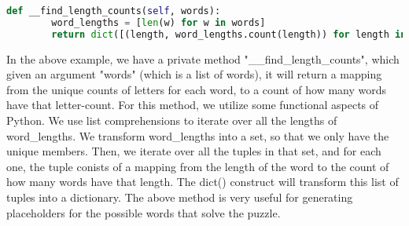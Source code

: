 \documentclass[11pt]{article}
\begin{document}
\begin{minipage}[t]{1\linewidth}
\begin{lstlisting}[language=Python, %
  title={Bash}, label=bash1]
    def __find_length_counts(self, words):
        word_lengths = [len(w) for w in words]
        return dict([(length, word_lengths.count(length)) for length in set(word_lengths)])
\end{lstlisting}
\end{minipage}

In the above example, we have a private method "\_\_find\_length\_counts", which given an argument "words" (which is a list of words), it will return a mapping from the unique counts of letters for each word, to a count of how many words have that letter-count. For this method, we utilize some functional aspects of Python. We use list comprehensions to iterate over all the lengths of word\_lengths. We transform word\_lengths into a set, so that we only have the unique members. Then, we iterate over all the tuples in that set, and for each one, the tuple conists of a mapping from the length of the word to the count of how many words have that length. The dict() construct will transform this list of tuples into a dictionary.
	The above method is very useful for generating placeholders for the possible words that solve the puzzle.



\end{document}
